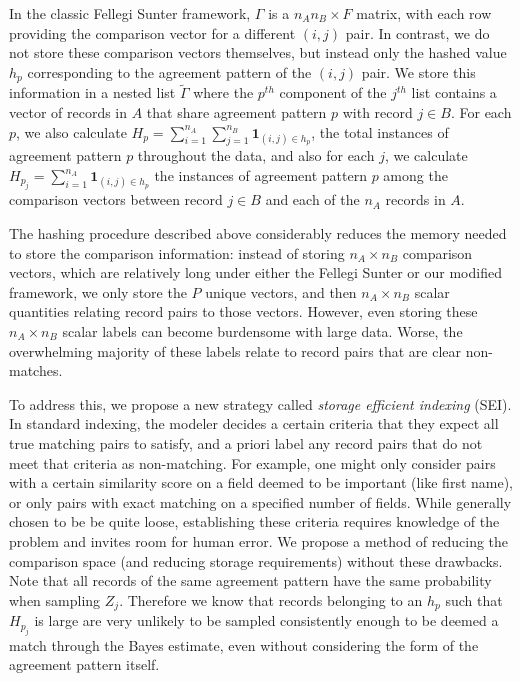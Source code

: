 \documentclass[12pt,letterpaper]{article}
\newcommand{\1}[1]{\mathbb{I}\!\left[#1\right]} %
\begin{document}
In the classic Fellegi Sunter framework, \(\Gamma\) is a
\(n_A n_B \times F\) matrix, with each row providing the comparison
vector for a different \((i,j)\) pair. In contrast, we do not store
these comparison vectors themselves, but instead only the hashed value $h_p$
corresponding to the agreement pattern of the \((i, j)\) pair. We store
this information in a nested list \(\tilde{\Gamma}\) where the
\(p^{th}\) component of the \(j^{th}\) list contains a vector of records
in \(A\) that share agreement pattern \(p\) with record \(j \in B\). For
each \(p\), we also calculate
\(H_p = \sum_{i=1}^{n_A}\sum_{j=1}^{n_B} \mathbf{1}_{(i,j) \in h_p}\),
the total instances of agreement pattern \(p\) throughout the data, and
also for each \(j\), we calculate
\(H_{p_j} = \sum_{i=1}^{n_A} \mathbf{1}_{{(i,j) \in h_p}}\) the
instances of agreement pattern \(p\) among the comparison vectors
between record \(j \in B\) and each of the \(n_A\) records in \(A\).

The hashing procedure described above considerably reduces the memory
needed to store the comparison information: instead of storing
\(n_A \times n_B\) comparison vectors, which are relatively long under
either the Fellegi Sunter or our modified framework, we only store the
\(P\) unique vectors, and then \(n_A \times n_B\) scalar quantities
relating record pairs to those vectors. However, even storing these
\(n_A \times n_B\) scalar labels can become burdensome with large data.
Worse, the overwhelming majority of these labels relate to record pairs
that are clear non-matches.

To address this, we propose a new strategy called \emph{storage	efficient indexing} (SEI). In standard indexing, the modeler decides a
certain criteria that they expect all true matching pairs to satisfy,
and a priori label any record pairs that do not meet that criteria as
non-matching. For example, one might only consider pairs with a certain
similarity score on a field deemed to be important (like first name), or
only pairs with exact matching on a specified number of fields. While
generally chosen to be be quite loose, establishing these criteria
requires knowledge of the problem and invites room for human error. We
propose a method of reducing the comparison space (and reducing storage
requirements) without these drawbacks. Note that all records of the same
agreement pattern have the same probability when sampling \(Z_j\).
Therefore we know that records belonging to an \(h_p\) such that
\(H_{p_j}\) is large are very unlikely to be sampled consistently enough
to be deemed a match through the Bayes estimate, even without
considering the form of the agreement pattern itself.
\end{document}
